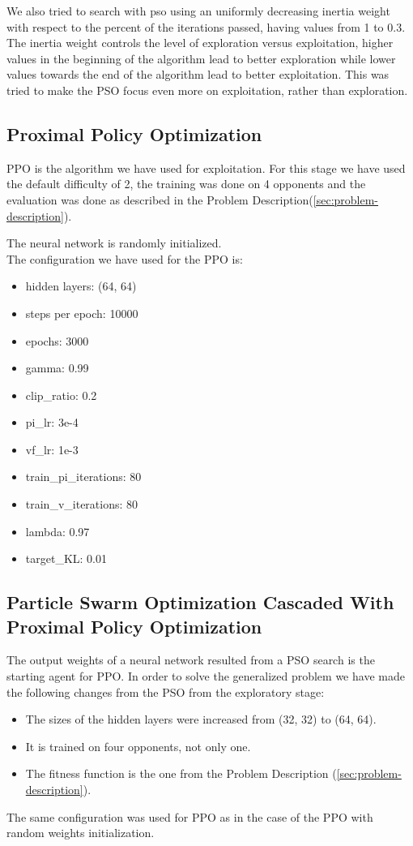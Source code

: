 \documentclass[conference]{IEEEtran}
\begin{document}
    We also tried to search with pso using an uniformly decreasing inertia weight with respect
    to the percent of the iterations passed, having values from 1 to 0.3. The inertia weight controls the level of exploration versus exploitation, higher values in the beginning of the algorithm lead to better exploration while lower values towards the end of the algorithm lead to better exploitation.
    This was tried to make the PSO focus even more on exploitation, rather than exploration.

    \subsection{Proximal Policy Optimization}\label{subsec:proximal-policy-optimization}
    PPO\cite{ppo} is the algorithm we have used for exploitation.
    For this stage we have used the default difficulty of 2, the training was done on 4 opponents
    and the evaluation was done as described in the Problem Description(\ref{sec:problem-description}).

    The neural network is randomly initialized. \\
    The configuration we have used for the PPO is:
    \begin{itemize}
        \item hidden layers: (64, 64)
        \item steps per epoch: 10000
        \item epochs: 3000
        \item gamma: 0.99
        \item clip\_ratio: 0.2
        \item pi\_lr: 3e-4
        \item vf\_lr: 1e-3
        \item train\_pi\_iterations: 80
        \item train\_v\_iterations: 80
        \item lambda: 0.97
        \item target\_KL: 0.01
    \end{itemize}

    \subsection{Particle Swarm Optimization Cascaded With Proximal Policy Optimization}\label{subsec:particle-swarm-optimization-cascaded-with-proximal-policy-optimization}
    The output weights of a neural network resulted from a PSO search is the starting agent for PPO\@.
    In order to solve the generalized problem we have made the following changes from the PSO from the exploratory stage:
    \begin{itemize}
        \item The sizes of the hidden layers were increased from (32, 32) to (64, 64).
        \item It is trained on four opponents, not only one.
        \item The fitness function is the one from the Problem Description (\ref{sec:problem-description}).
    \end{itemize}
    The same configuration was used for PPO as in the case of the PPO with random
    weights initialization.
\end{document}
